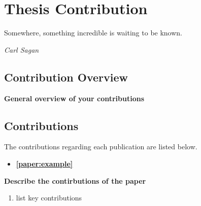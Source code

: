 
		
\chapter{Thesis Contribution}
\label{ch.contribution}
	\vspace{-2 cm}
\epigraph{Somewhere, something incredible is waiting to be known.}{\textit{Carl Sagan}}

\section{Contribution Overview}

\textbf{General overview of your contributions}

\section{Contributions}

The contributions regarding each publication are listed below.

\begin{itemize}
  \item \textbf{\ref{paper:example}}
\end{itemize}
\vspace{-1 em}
\textbf{Describe the contirbutions of the paper}

\begin{enumerate}
\item list key contributions
\end{enumerate}


